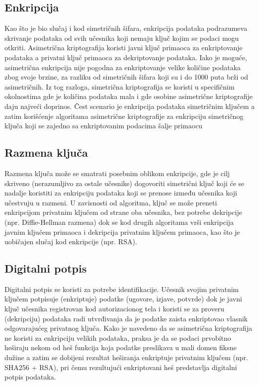\documentclass[a4paper]{article}
\begin{document}
\subsection{Enkripcija}
\label{subsec:enkripcija}
Kao što je bio slučaj i kod simetričnih šifara, enkripcija podataka podrazumeva skrivanje podataka od svih učesnika koji nemaju ključ kojim se podaci mogu otkriti. Asimetrična
kriptografija koristi javni ključ primaoca za enkriptovanje podataka a privatni ključ primaoca za dekriptovanje podataka. Iako je moguće, asimetrična enkripcija nije pogodna za enkriptovanje  velike količine podataka zbog svoje brzine, za razliku od simetričnih šifara koji su i do 1000 puta brži od asimetričnih. Iz tog razloga, simetrična kriptografija se koristi u specifičnim okolnostima gde je količina podataka mala i gde osobine asimetrične kriptografije daju najveći doprinos.
Čest scenario je enkripcija podataka simetričnim ključem a zatim
korišćenje algoritama asimetrične kriptografije za enkripciju simetričnog ključa koji se zajedno sa enkriptovanim podacima šalje primaocu

\subsection{Razmena ključa}
\label{subsec:razmena_ključa}
Razmena ključa može se smatrati posebnim oblikom enkripcije, gde je cilj skriveno (nerazumljivo za ostale učesnike) dogovoriti simetrični ključ koji će se nadalje koristiti za enkripciju podataka koji se prenose između učesnika koji učestvuju u razmeni. U zavisnosti od algoritma, ključ se može preneti enkripcijom privatnim ključem od strane oba učesnika, bez potrebe dekripcije (npr. Diffie-Hellman razmena) dok se kod drugih algoritama vrši enkripcija javnim ključem primaoca i dekripcija privatnim ključem primaoca, kao što je uobičajen slučaj kod enkripcije (npr. RSA). 

\subsection{Digitalni potpis}
\label{subsec:digitalni_potpis}
Digitalni potpis se koristi za potrebe identifikacije. Učesnik svojim privatnim ključem potpisuje (enkriptuje) podatke (ugovore, izjave, potvrde) dok je javni ključ učesnika
registrovan kod autorizacionog tela i koristi se za proveru (dekripciju) podataka radi utvrđivanja da je podatke zaista enkriptovao vlasnik odgovarajućeg privatnog ključa. Kako je
navedeno da se asimetrična kriptografija ne koristi za enkripciju velikih podataka, praksa je da se podaci prvobitno heširaju nekom od heš funkcija koja podatke preslikava u mali domen fiksne dužine a zatim se dobijeni rezultat heširanja enkriptuje privatnim ključem (npr. SHA256 + RSA), pri čemu rezultujući enkriptovani heš predstavlja digitalni potpis podataka. 
\end{document}
